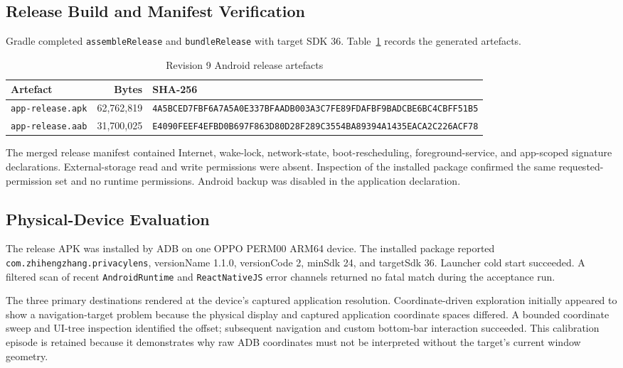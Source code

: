 \subsection{Release Build and Manifest Verification}

Gradle completed \texttt{assembleRelease} and \texttt{bundleRelease} with target SDK 36. Table~\ref{tab:r9-artifacts} records the generated artefacts.

\begin{table}[H]
\centering
\small
\caption{Revision 9 Android release artefacts}
\label{tab:r9-artifacts}
\begin{tabular}{p{}r p{}}
\toprule
Artefact & Bytes & SHA-256 \\
\midrule
\texttt{app-release.apk} & 62,762,819 & \texttt{4A5BCED7FBF6A7A5A0E337BFAADB003A3C7FE89FDAFBF9BADCBE6BC4CBFF51B5} \\
\texttt{app-release.aab} & 31,700,025 & \texttt{E4090FEEF4EFBD0B697F863D80D28F289C3554BA89394A1435EACA2C226ACF78} \\
\bottomrule
\end{tabular}
\end{table}

The merged release manifest contained Internet, wake-lock, network-state, boot-rescheduling, foreground-service, and app-scoped signature declarations. External-storage read and write permissions were absent. Inspection of the installed package confirmed the same requested-permission set and no runtime permissions. Android backup was disabled in the application declaration.

\subsection{Physical-Device Evaluation}

The release APK was installed by ADB on one OPPO PERM00 ARM64 device. The installed package reported \texttt{com.zhihengzhang.privacylens}, versionName 1.1.0, versionCode 2, minSdk 24, and targetSdk 36. Launcher cold start succeeded. A filtered scan of recent \texttt{AndroidRuntime} and \texttt{ReactNativeJS} error channels returned no fatal match during the acceptance run.

The three primary destinations rendered at the device's captured application resolution. Coordinate-driven exploration initially appeared to show a navigation-target problem because the physical display and captured application coordinate spaces differed. A bounded coordinate sweep and UI-tree inspection identified the offset; subsequent navigation and custom bottom-bar interaction succeeded. This calibration episode is retained because it demonstrates why raw ADB coordinates must not be interpreted without the target's current window geometry.


